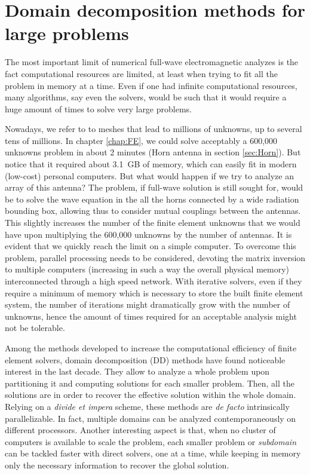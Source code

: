 \graphicspath{{img/ch2/}}
\chapter[Domain decomposition methods]{Domain decomposition methods for large  problems} \label{chap:DD}

The most important limit of numerical full-wave electromagnetic analyzes is the fact computational resources are limited, at least when trying to fit all the problem in memory at a time. Even if one had infinite computational resources, many algorithms, say even the solvers, would be such that it would require a huge amount of times to solve very large problems. 

Nowadays, we refer to  to meshes that lead to millions of unknowns, up to several tens of millions. In chapter \ref{chap:FE}, we could solve acceptably a 600,000 unknowns problem in about 2 minutes (Horn antenna in section \ref{sec:Horn}). But notice that it required about 3.1~GB of memory, which can easily fit in modern (low-cost) personal computers. But what would happen if we try to analyze an array of this antenna? The problem, if full-wave solution is still sought for, would be to solve the wave equation in the all the horns connected by a wide radiation bounding box, allowing thus to consider mutual couplings between the antennas. This slightly increases the number of the finite element unknowns that we would have upon multiplying the 600,000 unknowns by the number of antennas. It is evident that we quickly reach the limit on a simple computer. To overcome this problem, parallel processing needs to be considered, devoting the matrix inversion to multiple computers (increasing in such a way the overall physical memory) interconnected through a high speed network. With iterative solvers, even if they require a minimum of memory which is necessary to store the built finite element system, the number of iterations might dramatically grow with the number of unknowns, hence the amount of times required for an acceptable analysis might not be tolerable.

Among the methods developed to increase the computational efficiency of finite element solvers, domain decomposition (DD) methods have found noticeable interest in the last decade.  They allow to analyze a whole problem upon partitioning it and computing solutions for each smaller problem. Then, all the solutions are  in order to recover the effective solution within the whole domain. Relying on a \textit{divide et impera} scheme, these methods are \textit{de facto} intrinsically parallelizable. In fact, multiple domains can be analyzed contemporaneously on different processors. Another interesting aspect is that, when no cluster of computers is available to scale the problem, each smaller problem or \textit{subdomain} can be tackled faster with direct solvers, one at a time, while keeping in memory only the necessary information to recover the global solution. 

